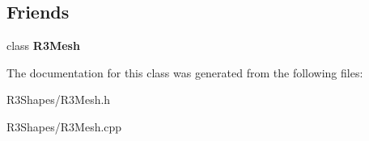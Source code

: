 \subsection*{Friends}
\begin{DoxyCompactItemize}
\item 
class {\bfseries R3\+Mesh}\hypertarget{class_r3_mesh_vertex_ad14836d445f783f84efa263168bb3167}{}\label{class_r3_mesh_vertex_ad14836d445f783f84efa263168bb3167}

\end{DoxyCompactItemize}


The documentation for this class was generated from the following files\+:\begin{DoxyCompactItemize}
\item 
R3\+Shapes/R3\+Mesh.\+h\item 
R3\+Shapes/R3\+Mesh.\+cpp\end{DoxyCompactItemize}

